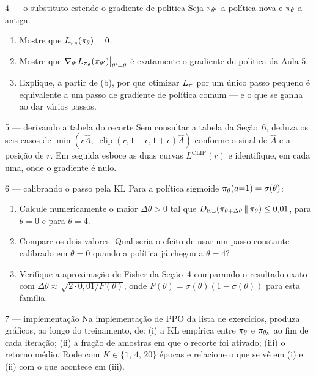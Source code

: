 \documentclass[11pt, a4paper]{article}
\newcommand{\Ahat}{\hat{A}}
\newcommand{\KLd}[2]{D_{\mathrm{KL}}\!\left(#1\,\|\,#2\right)}
\DeclareMathOperator{\clipop}{clip}
\newcommand{\Lsub}[1]{L_{#1}}
\begin{document}
\begin{exbox}{4 — o substituto estende o gradiente de política}
Seja $\pi_{\theta'}$ a política nova e $\pi_\theta$ a antiga.
\begin{enumerate}[label=(\alph*)]
  \item Mostre que $\Lsub{\pol_\theta}(\pol_\theta) = 0$.
  \item Mostre que $\nabla_{\theta'}\Lsub{\pol_\theta}(\pol_{\theta'})
        \big|_{\theta'=\theta}$ é exatamente o gradiente de política da Aula 5.
  \item Explique, a partir de (b), por que otimizar $\Lsub{\pol}$ por um único
        passo pequeno é equivalente a um passo de gradiente de política comum
        --- e o que se ganha ao dar vários passos.
\end{enumerate}
\end{exbox}

\begin{exbox}{5 — derivando a tabela do recorte}
Sem consultar a tabela da Seção~6, deduza os seis casos de
$\min\!\left(r\Ahat,\; \clipop(r,1-\epsilon,1+\epsilon)\Ahat\right)$ conforme o
sinal de $\Ahat$ e a posição de $r$. Em seguida esboce as duas curvas
$L^{\mathrm{CLIP}}(r)$ e identifique, em cada uma, onde o gradiente é nulo.
\end{exbox}

\begin{exbox}{6 — calibrando o passo pela KL}
Para a política sigmoide $\pi_\theta(a{=}1) = \sigma(\theta)$:
\begin{enumerate}[label=(\alph*)]
  \item Calcule numericamente o maior $\Delta\theta > 0$ tal que
        $\KLd{\pol_{\theta+\Delta\theta}}{\pol_\theta} \le 0{,}01$, para
        $\theta = 0$ e para $\theta = 4$.
  \item Compare os dois valores. Qual seria o efeito de usar um passo constante
        calibrado em $\theta = 0$ quando a política já chegou a $\theta = 4$?
  \item Verifique a aproximação de Fisher da Seção~4 comparando o resultado
        exato com $\Delta\theta \approx \sqrt{2\cdot 0{,}01 / F(\theta)}$, onde
        $F(\theta) = \sigma(\theta)(1-\sigma(\theta))$ para esta família.
\end{enumerate}
\end{exbox}

\begin{exbox}{7 — implementação}
Na implementação de PPO da lista de exercícios, produza gráficos, ao longo do
treinamento, de: (i) a KL empírica entre $\pi_\theta$ e $\pi_{\theta_k}$ ao
fim de cada iteração; (ii) a fração de amostras em que o recorte foi ativado;
(iii) o retorno médio. Rode com $K \in \{1,\, 4,\, 20\}$ épocas e relacione o
que se vê em (i) e (ii) com o que acontece em (iii).
\end{exbox}
\end{document}

